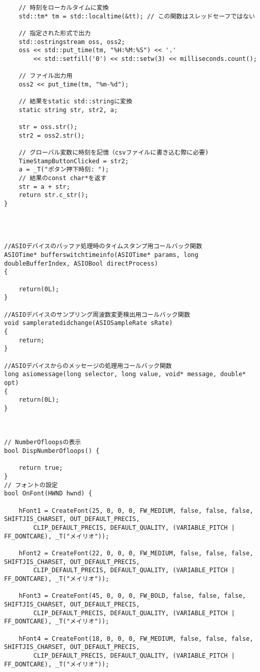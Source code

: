 \begin{verbatim}
	// 時刻をローカルタイムに変換
	std::tm* tm = std::localtime(&tt); // この関数はスレッドセーフではない

	// 指定された形式で出力
	std::ostringstream oss, oss2;
	oss << std::put_time(tm, "%H:%M:%S") << '.'
		<< std::setfill('0') << std::setw(3) << milliseconds.count();

	// ファイル出力用
	oss2 << put_time(tm, "%m-%d");

	// 結果をstatic std::stringに変換
	static string str, str2, a;
	
	str = oss.str();
	str2 = oss2.str();

	// グローバル変数に時刻を記憶（csvファイルに書き込む際に必要)
	TimeStampButtonClicked = str2;
	a = _T("ボタン押下時刻: ");
	// 結果のconst char*を返す
	str = a + str;
	return str.c_str();
}




//ASIOデバイスのバッファ処理時のタイムスタンプ用コールバック関数
ASIOTime* bufferswitchtimeinfo(ASIOTime* params, long doubleBufferIndex, ASIOBool directProcess)
{
	
	return(0L);
}

//ASIOデバイスのサンプリング周波数変更検出用コールバック関数
void sampleratedidchange(ASIOSampleRate sRate)
{
	return;
}

//ASIOデバイスからのメッセージの処理用コールバック関数
long asiomessage(long selector, long value, void* message, double* opt)
{
	return(0L);
}



// NumberOfloopsの表示
bool DispNumberOfloops() {

	return true;
}
// フォントの設定
bool OnFont(HWND hwnd) {

	hFont1 = CreateFont(25, 0, 0, 0, FW_MEDIUM, false, false, false, SHIFTJIS_CHARSET, OUT_DEFAULT_PRECIS,
		CLIP_DEFAULT_PRECIS, DEFAULT_QUALITY, (VARIABLE_PITCH | FF_DONTCARE), _T("メイリオ"));

	hFont2 = CreateFont(22, 0, 0, 0, FW_MEDIUM, false, false, false, SHIFTJIS_CHARSET, OUT_DEFAULT_PRECIS,
		CLIP_DEFAULT_PRECIS, DEFAULT_QUALITY, (VARIABLE_PITCH | FF_DONTCARE), _T("メイリオ"));

	hFont3 = CreateFont(45, 0, 0, 0, FW_BOLD, false, false, false, SHIFTJIS_CHARSET, OUT_DEFAULT_PRECIS,
		CLIP_DEFAULT_PRECIS, DEFAULT_QUALITY, (VARIABLE_PITCH | FF_DONTCARE), _T("メイリオ"));

	hFont4 = CreateFont(18, 0, 0, 0, FW_MEDIUM, false, false, false, SHIFTJIS_CHARSET, OUT_DEFAULT_PRECIS,
		CLIP_DEFAULT_PRECIS, DEFAULT_QUALITY, (VARIABLE_PITCH | FF_DONTCARE), _T("メイリオ"));


\end{verbatim}
